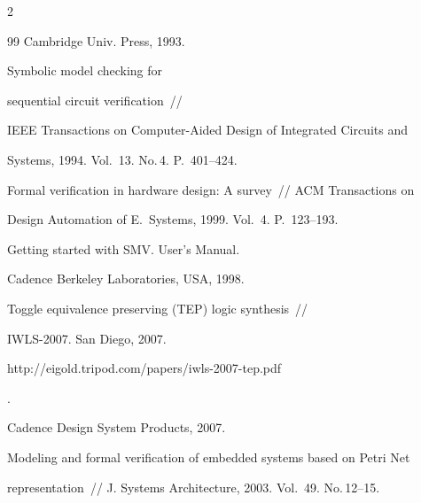 \begin{multicols}{2}
{{\begin{thebibliography}{99}
Cambridge Univ. Press, 1993.









Symbolic model checking for


sequential circuit verification~//


IEEE Transactions on Computer-Aided Design of Integrated Circuits and


Systems, 1994. Vol.~13. No.\,4. P.~401--424.









Formal verification in hardware design: A survey~// ACM Transactions on


Design Auto\-mation of E.~Systems, 1999. Vol.~4. P.~123--193.









Getting started with SMV. User's Manual.


Cadence Berkeley Laboratories, USA, 1998.









Toggle equivalence preserving (TEP) logic synthesis~//


IWLS-2007. San Diego, 2007. {\sf


http://eigold.tripod.com/papers/iwls-2007-tep.pdf}.







Cadence Design System Products, 2007.









Modeling and formal veri\-fi\-cation of embedded systems based on Petri Net


repre\-sen\-tation~// J. Systems Architecture, 2003. Vol.~49. No.\,12--15.



\end{thebibliography}}}
\end{multicols}
